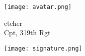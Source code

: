 \begin{flushright}
    \hfill \parbox{0.3\textwidth}{\raggedright \hfill \texttt{[image: avatar.png]}} \hfil \parbox{0.4\textwidth}{\raggedright etcher \\ Cpt, 319th Rgt \\ \inmem{}}%

\hfill \parbox{0.3\textwidth}{\raggedright \hfill } \hfil \parbox{0.4\textwidth}%
{\centering \texttt{[image: signature.png]}}%
\end{flushright}%

\vfil%
